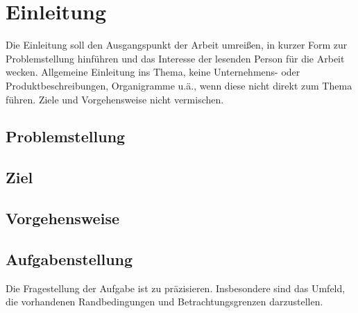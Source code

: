 
\chapter{Einleitung}
Die Einleitung soll den Ausgangspunkt der Arbeit umreißen, in kurzer Form zur Problemstellung hinführen und
das Interesse der lesenden Person für die Arbeit wecken. Allgemeine Einleitung ins Thema, keine Unternehmens-
oder Produktbeschreibungen, Organigramme u.ä., wenn diese nicht direkt zum Thema führen. Ziele
und Vorgehensweise nicht vermischen.

\section{Problemstellung}

\section{Ziel}

\section{Vorgehensweise}

\section{Aufgabenstellung}
Die Fragestellung der Aufgabe ist zu präzisieren. Insbesondere sind das Umfeld, die vorhandenen Randbedingungen
und Betrachtungsgrenzen darzustellen.
